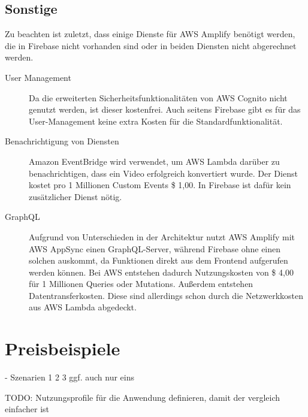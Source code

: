 \subsection{Sonstige}

Zu beachten ist zuletzt, dass einige Dienste für \ac{AWS} Amplify benötigt werden, die in Firebase nicht vorhanden sind oder in beiden Diensten nicht abgerechnet werden.
\begin{description}
\item[User Management] Da die erweiterten Sicherheitsfunktionalitäten von \ac{AWS} Cognito nicht genutzt werden, ist dieser kostenfrei. Auch seitens Firebase gibt es für das User-Management keine extra Kosten für die Standardfunktionalität.
\item[Benachrichtigung von Diensten] Amazon EventBridge wird verwendet, um \ac{AWS} Lambda darüber zu benachrichtigen, dass ein Video erfolgreich konvertiert wurde. Der Dienst kostet pro 1 Millionen Custom Events \$ 1,00. In Firebase ist dafür kein zusätzlicher Dienst nötig.
\item[GraphQL] Aufgrund von Unterschieden in der Architektur nutzt \ac{AWS} Amplify mit AWS AppSync einen GraphQL-Server, während Firebase ohne einen solchen auskommt, da Funktionen direkt aus dem Frontend aufgerufen werden können. Bei \ac{AWS} entstehen dadurch Nutzungskosten von \$ 4,00 für 1 Millionen Queries oder Mutations. Außerdem entstehen Datentransferkosten. Diese sind allerdings schon durch die Netzwerkkosten aus \ac{AWS} Lambda abgedeckt.
\end{description}

\section{Preisbeispiele}

- Szenarien 1 2 3 ggf. auch nur eins

TODO: Nutzungsprofile für die Anwendung definieren, damit der vergleich einfacher ist